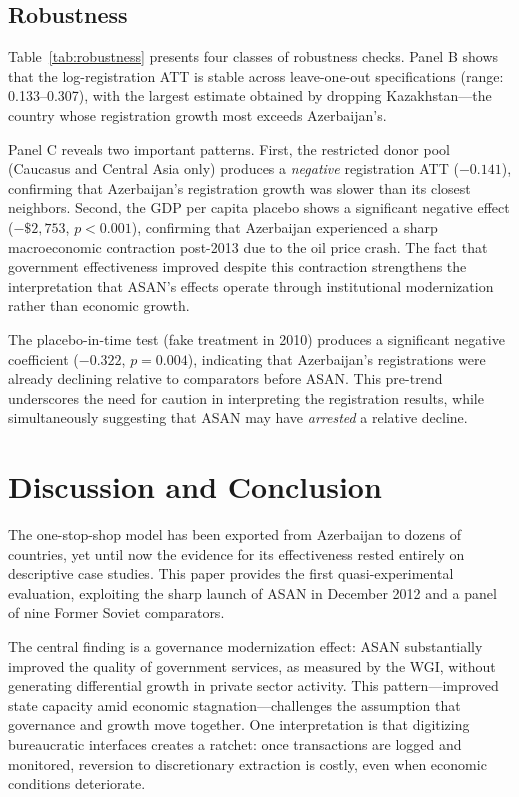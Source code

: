 \documentclass[12pt]{article}
\begin{document}
\subsection{Robustness}



Table~\ref{tab:robustness} presents four classes of robustness checks. Panel B shows that the log-registration ATT is stable across leave-one-out specifications (range: 0.133--0.307), with the largest estimate obtained by dropping Kazakhstan---the country whose registration growth most exceeds Azerbaijan's.

Panel C reveals two important patterns. First, the restricted donor pool (Caucasus and Central Asia only) produces a \textit{negative} registration ATT ($-0.141$), confirming that Azerbaijan's registration growth was slower than its closest neighbors. Second, the GDP per capita placebo shows a significant negative effect ($-\$2,753$, $p < 0.001$), confirming that Azerbaijan experienced a sharp macroeconomic contraction post-2013 due to the oil price crash. The fact that government effectiveness improved despite this contraction strengthens the interpretation that ASAN's effects operate through institutional modernization rather than economic growth.

The placebo-in-time test (fake treatment in 2010) produces a significant negative coefficient ($-0.322$, $p = 0.004$), indicating that Azerbaijan's registrations were already declining relative to comparators before ASAN. This pre-trend underscores the need for caution in interpreting the registration results, while simultaneously suggesting that ASAN may have \textit{arrested} a relative decline.


\section{Discussion and Conclusion}

The one-stop-shop model has been exported from Azerbaijan to dozens of countries, yet until now the evidence for its effectiveness rested entirely on descriptive case studies. This paper provides the first quasi-experimental evaluation, exploiting the sharp launch of ASAN in December 2012 and a panel of nine Former Soviet comparators.

The central finding is a governance modernization effect: ASAN substantially improved the quality of government services, as measured by the WGI, without generating differential growth in private sector activity. This pattern---improved state capacity amid economic stagnation---challenges the assumption that governance and growth move together. One interpretation is that digitizing bureaucratic interfaces creates a ratchet: once transactions are logged and monitored, reversion to discretionary extraction is costly, even when economic conditions deteriorate.
\end{document}

